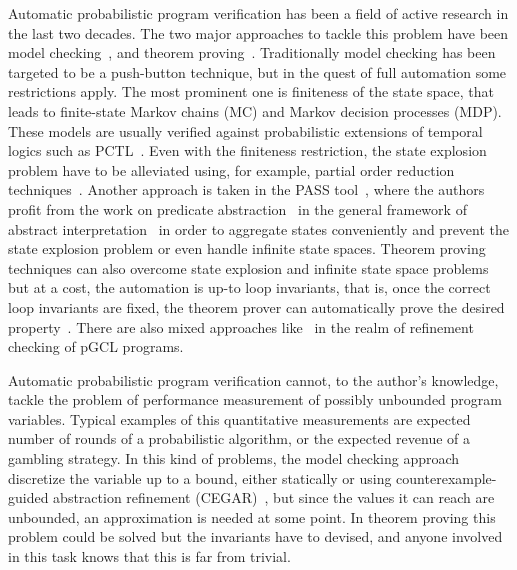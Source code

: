 \documentclass{eptcs}
\theoremstyle{plain}
\theoremstyle{definition}
\begin{document}
Automatic probabilistic program verification has been a field of active research in the last two decades.
The two major approaches to tackle this problem have been model checking~\cite{vardi85auto,hansson94pctl,bianco95mcp,hinton06prism}, and theorem proving~\cite{hurd05mech,celiku06mech}.
Traditionally model checking has been targeted to be a push-button technique, but in the quest of full automation some restrictions apply.
The most prominent one is finiteness of the state space, that leads to finite-state Markov chains (MC) and Markov decision processes (MDP).
These models are usually verified against probabilistic extensions of temporal logics such as PCTL~\cite{hansson94pctl,bianco95mcp}.
Even with the finiteness restriction, the state explosion problem have to be alleviated using, for example, partial order reduction techniques~\cite{baierDG06por}.
Another approach is taken in the PASS tool~\cite{wachterZH07pass,hermannsWZ08cegar}, where the authors profit from the work on predicate abstraction~\cite{graf97pa,uribe98abstractions} in the general framework of abstract interpretation~\cite{cousot77ai} in order to aggregate states conveniently and prevent the state explosion problem or even handle infinite state spaces.
Theorem proving techniques can also overcome state explosion and infinite state space problems but at a cost, the automation is up-to loop invariants, that is, once the correct loop invariants are fixed, the theorem prover can automatically prove the desired property~\cite{hurd05mech}.
There are also mixed approaches like~\cite{gordo08refutation} in the realm of refinement checking of pGCL programs.

Automatic probabilistic program verification cannot, to the author's knowledge, tackle the problem of performance measurement of possibly unbounded program variables.
Typical examples of this quantitative measurements are expected number of rounds of a probabilistic algorithm, or the expected revenue of a gambling strategy.
In this kind of problems, the model checking approach discretize the variable up to a bound, either statically or using counterexample-guided abstraction refinement (CEGAR)~\cite{hermannsWZ08cegar}, but since the values it can reach are unbounded, an approximation is needed at some point.
In theorem proving this problem could be solved but the invariants have to devised, and anyone involved in this task knows that this is far from trivial.
\end{document}
